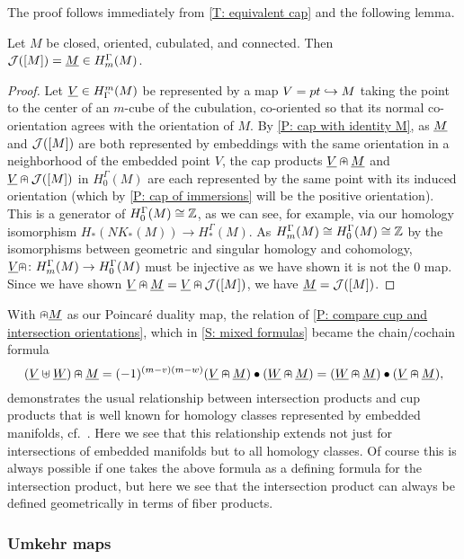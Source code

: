 The proof follows immediately from \cref{T: equivalent cap} and the following lemma.

\begin{lemma}
	Let $M$ be closed, oriented, cubulated, and connected.
	Then $\mathcal{J}([M]) = \underline{M} \in H_m^\Gamma(M)$.
\end{lemma}

\begin{proof}
	Let $\underline{V} \in H^m_\Gamma(M)$ be represented by a map $V = pt \hookrightarrow M$ taking the point to the center of an $m$-cube of the cubulation, co-oriented so that its normal co-orientation agrees with the orientation of $M$.
	By \cref{P: cap with identity M}, as $\underline{M}$ and $\mathcal{J}([M])$ are both represented by embeddings with the same orientation in a neighborhood of the embedded point $V$, the cap products $\underline{V}\nplus \underline{M}$ and $\underline{V}\nplus \mathcal{J}([M])$ in $H_0^\Gamma(M)$ are each represented by the same point with its induced orientation (which by \cref{P: cap of immersions} will be the positive orientation).
	This is a generator of $H_0^\Gamma(M) \cong \mathbb{Z}$, as we can see, for example, via our homology isomorphism $H_*(NK_*(M)) \to H_*^\Gamma(M)$.
	As $H_m^\Gamma(M) \cong H_0^\Gamma(M) \cong \mathbb{Z}$ by the isomorphisms between geometric and singular homology and cohomology, $\underline{V}\nplus \colon H_m^\Gamma(M) \to H_0^\Gamma(M)$ must be injective as we have shown it is not the $0$ map.
	Since we have shown $\underline{V}\nplus\underline{M} = \underline{V}\nplus\mathcal{J}([M])$, we have $\underline{M} = \mathcal{J}([M])$.
\end{proof}

With $\nplus \underline{M}$ as our Poincar\'e duality map, the relation of \cref{P: compare cup and intersection orientations}, which in \cref{S: mixed formulas} became the chain/cochain formula
$$(\underline{V}\uplus \underline{W})\nplus \underline{M} = (-1)^{(m-v)(m-w)}(\underline{V}\nplus \underline{M})\bullet(\underline{W}\nplus \underline{M}) = (\underline{W}\nplus \underline{M})\bullet(\underline{V}\nplus \underline{M}),$$
demonstrates the usual relationship between intersection products and cup products that is well known for homology classes represented by embedded manifolds, cf.\ \cite[Section VI.11]{Bred97}.
Here we see that this relationship extends not just for intersections of embedded manifolds but to all homology classes.
Of course this is always possible if one takes the above formula as a defining formula for the intersection product, but here we see that the intersection product can always be defined geometrically in terms of fiber products.

\subsubsection{Umkehr maps}

